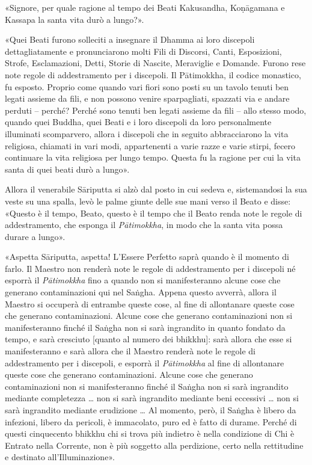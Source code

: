 «Signore, per quale ragione al tempo dei Beati Kakusandha, Koṇāgamana e
Kassapa la santa vita durò a lungo?».


«Quei Beati furono solleciti a insegnare il Dhamma ai loro discepoli
dettagliatamente e pronunciarono molti Fili di Discorsi, Canti,
Esposizioni, Strofe, Esclamazioni, Detti, Storie di Nascite, Meraviglie
e Domande. Furono rese note regole di addestramento per i discepoli. Il
Pātimokkha, il codice monastico, fu esposto. Proprio come quando vari
fiori sono posti su un tavolo tenuti ben legati assieme da fili, e non
possono venire sparpagliati, spazzati via e andare perduti – perché?
Perché sono tenuti ben legati assieme da fili – allo stesso modo, quando
quei Buddha, quei Beati e i loro discepoli da loro personalmente
illuminati scomparvero, allora i discepoli che in seguito abbracciarono
la vita religiosa, chiamati in vari modi, appartenenti a varie razze e
varie stirpi, fecero continuare la vita religiosa per lungo tempo.
Questa fu la ragione per cui la vita santa di quei beati durò a lungo».


Allora il venerabile Sāriputta si alzò dal posto in cui sedeva e,
sistemandosi la sua veste su una spalla, levò le palme giunte delle sue
mani verso il Beato e disse: «Questo è il tempo, Beato, questo è il
tempo che il Beato renda note le regole di addestramento, che esponga il
\emph{Pātimokkha}, in modo che la santa vita possa durare a lungo».


«Aspetta Sāriputta, aspetta! L’Essere Perfetto saprà quando è il momento
di farlo. Il Maestro non renderà note le regole di addestramento per i
discepoli né esporrà il \emph{Pātimokkha} fino a quando non si manifesteranno
alcune cose che generano contaminazioni qui nel Saṅgha. Appena questo
avverrà, allora il Maestro si occuperà di entrambe queste cose, al fine
di allontanare queste cose che generano contaminazioni. Alcune cose che
generano contaminazioni non si manifesteranno finché il Saṅgha non si
sarà ingrandito in quanto fondato da tempo, e sarà cresciuto [quanto al
numero dei bhikkhu]: sarà allora che esse si manifesteranno e sarà
allora che il Maestro renderà note le regole di addestramento per i
discepoli, e esporrà il \emph{Pātimokkha} al fine di allontanare queste cose
che generano contaminazioni. Alcune cose che generano contaminazioni non
si manifesteranno finché il Saṅgha non si sarà ingrandito mediante
completezza … non si sarà ingrandito mediante beni eccessivi … non si
sarà ingrandito mediante erudizione … Al momento, però, il Saṅgha è
libero da infezioni, libero da pericoli, è immacolato, puro ed è fatto
di durame. Perché di questi cinquecento bhikkhu chi si trova più
indietro è nella condizione di Chi è Entrato nella Corrente, non è più
soggetto alla perdizione, certo nella rettitudine e destinato
all’Illuminazione».


